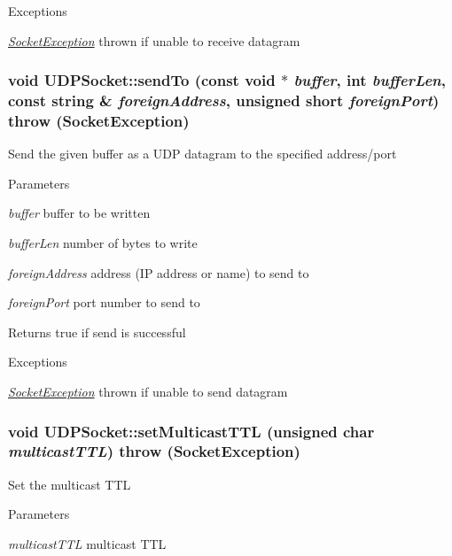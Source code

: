 \begin{DoxyExceptions}{Exceptions}
\item[{\em \hyperlink{classSocketException}{SocketException}}]thrown if unable to receive datagram \end{DoxyExceptions}
\hypertarget{classUDPSocket_a41a3595e226f273953cbd38618af5d5b}{
\subsubsection[{sendTo}]{\setlength{\rightskip}{0pt plus 5cm}void UDPSocket::sendTo (const void $\ast$ {\em buffer}, \/  int {\em bufferLen}, \/  const string \& {\em foreignAddress}, \/  unsigned short {\em foreignPort})  throw ({\bf SocketException})}}
\label{classUDPSocket_a41a3595e226f273953cbd38618af5d5b}
Send the given buffer as a UDP datagram to the specified address/port 
\begin{DoxyParams}{Parameters}
\item[{\em buffer}]buffer to be written \item[{\em bufferLen}]number of bytes to write \item[{\em foreignAddress}]address (IP address or name) to send to \item[{\em foreignPort}]port number to send to \end{DoxyParams}
\begin{DoxyReturn}{Returns}
true if send is successful 
\end{DoxyReturn}

\begin{DoxyExceptions}{Exceptions}
\item[{\em \hyperlink{classSocketException}{SocketException}}]thrown if unable to send datagram \end{DoxyExceptions}
\hypertarget{classUDPSocket_a4dcfff33b45d1b84b5a602fc6f4a27f8}{
\subsubsection[{setMulticastTTL}]{\setlength{\rightskip}{0pt plus 5cm}void UDPSocket::setMulticastTTL (unsigned char {\em multicastTTL})  throw ({\bf SocketException})}}
\label{classUDPSocket_a4dcfff33b45d1b84b5a602fc6f4a27f8}
Set the multicast TTL 
\begin{DoxyParams}{Parameters}
\item[{\em multicastTTL}]multicast TTL \end{DoxyParams}

